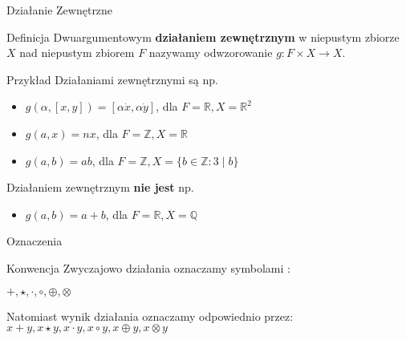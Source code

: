 \documentclass{beamer}
\begin{document}
\begin{frame}{Działanie Zewnętrzne}
    \begin{block}{Definicja}
        Dwuargumentowym \textbf{działaniem zewnętrznym} w niepustym zbiorze $X$ nad niepustym zbiorem $F$ nazywamy odwzorowanie
        $g : F \times X \rightarrow X$.
    \end{block}
    \pause 
    \begin{exampleblock}{Przykład}
        Działaniami zewnętrznymi są np.
        \begin{itemize}
            \item $g(\alpha, [x,y]) = [\alpha \dot x, \alpha \dot y]$, dla $F = \mathbb{R}, X = \mathbb{R}^2$
            \item $g(a,x) = nx$, dla $F = \mathbb{Z},  X =\mathbb{R}$
            \item $g(a,b) = ab$, dla $F = \mathbb{Z}, X = \{ b \in \mathbb{Z} : 3 \mid b \}$
        \end{itemize}
        Działaniem zewnętrznym \textbf{nie jest} np. 
        \begin{itemize}
            \item $g(a,b) = a +b $, dla $F = \mathbb{R}, X = \mathbb{Q}$
        \end{itemize}
    \end{exampleblock}
\end{frame}

\begin{frame}{Oznaczenia}
    \begin{alertblock}{Konwencja}
        Zwyczajowo działania oznaczamy symbolami : 
        
        $ +, \star, \cdot, \circ, \oplus, \otimes $

        Natomiast wynik działania oznaczamy odpowiednio przez: $x +y, x\star y, x \cdot y, x\circ y, x \oplus y, x\otimes y$
    \end{alertblock}
\end{frame}
\end{document}
